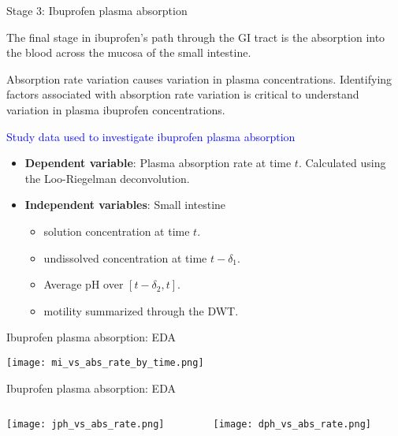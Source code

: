 \documentclass[handout]{beamer}
\begin{document}
\begin{frame}{Stage 3: Ibuprofen plasma absorption}

\small

The final stage in ibuprofen's path through the GI tract is the absorption into the blood across the mucosa of the small intestine.

\smallskip

Absorption rate variation causes variation in plasma concentrations. Identifying factors associated with absorption rate variation is critical to understand variation in plasma ibuprofen concentrations.

\bigskip


\textcolor{blue}{Study data used to investigate ibuprofen plasma absorption}
\begin{itemize}
	\item {\bf Dependent variable}: Plasma absorption rate at time $t$. Calculated using the Loo-Riegelman deconvolution.
	\item {\bf Independent variables}: Small intestine
	\begin{itemize}
		\item solution concentration at time $t$.
		\item undissolved concentration at time $t - \delta_1$.
		\item Average pH over $[t - \delta_2, t]$.
		\item motility summarized through the DWT.
	\end{itemize}
\end{itemize}

\end{frame}

\begin{frame}{Ibuprofen plasma absorption: EDA}

\texttt{[image: mi\_vs\_abs\_rate\_by\_time.png]}

\end{frame}

\begin{frame}{Ibuprofen plasma absorption: EDA}

\begin{columns}
\begin{column}{.5\textwidth}
\texttt{[image: jph\_vs\_abs\_rate.png]}
\end{column}
\begin{column}{.5\textwidth}
\texttt{[image: dph\_vs\_abs\_rate.png]}
\end{column}
\end{columns}



\end{frame}
\end{document}
